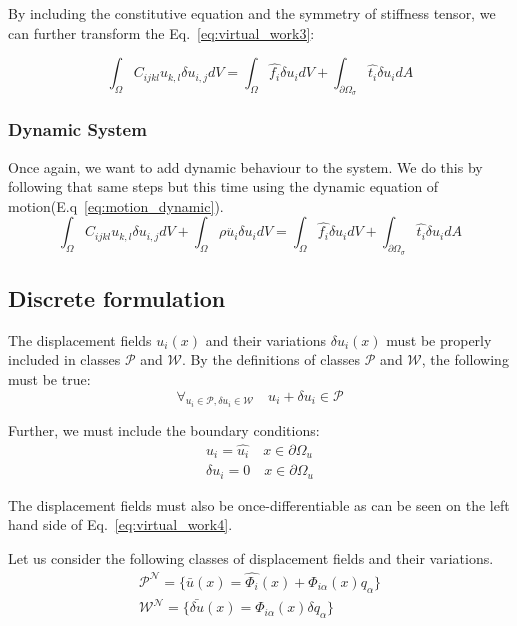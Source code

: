 \documentclass[en]{minipw} %
\begin{document}
By including the constitutive equation and the symmetry of stiffness tensor, we can further transform the Eq.~\ref{eq:virtual_work3}:

\begin{equation}
\label{eq:virtual_work4}
\int_{\Omega}C_{ijkl} u_{k,l} \delta u_{i,j} dV = \int_{\Omega} \hat{f_i} \delta u_{i} dV + \int_{\partial \Omega_{\sigma}} \hat{t_i} \delta u_{i} dA
\end{equation}

\subsubsection{Dynamic System}
Once again, we want to add dynamic behaviour to the system. We do this by following that same steps but this time using the dynamic equation of motion(E.q~\ref{eq:motion_dynamic}).
\begin{equation}
\label{eq:virtual_work_dynamic4}
\int_{\Omega}C_{ijkl} u_{k,l} \delta u_{i,j} dV + \int_{\Omega}\rho \ddot{u_i} \delta u_i dV = \int_{\Omega} \hat{f_i} \delta u_{i} dV + \int_{\partial \Omega_{\sigma}} \hat{t_i} \delta u_{i} dA
\end{equation}

\subsection{Discrete formulation}

The displacement fields $u_{i}(x)$ and their variations $\delta u_{i}(x)$ must be properly included in classes $\mathcal{P}$ and $\mathcal{W}$. By the definitions of classes $\mathcal{P}$ and $\mathcal{W}$, the following must be true:
\begin{equation}
\forall_{u_{i} \in \mathcal{P}, \delta u_{i} \in \mathcal{W}} \quad u_i + \delta u_i \in \mathcal{P}
\end{equation}

Further, we must include the boundary conditions:
\begin{equation}
\begin{aligned}
u_i = \hat{u_i} \quad x \in \partial  \Omega_{u}
\\
\delta u_i = 0 \quad x \in \partial  \Omega_{u}
\end{aligned}
\end{equation}

The displacement fields must also be once-differentiable as can be seen on the left hand side of Eq.~\ref{eq:virtual_work4}.

Let us consider the following classes of displacement fields and their variations.
\begin{equation}
\begin{aligned}
\mathcal{P^{N}} = \{\bar{u}(x) = \hat{\Phi_i}(x) + \Phi_{i \alpha}(x)q_{\alpha} \}
\\
\mathcal{W^{N}} = \{\bar{\delta u}(x) = \Phi_{i \alpha}(x) \delta q_{\alpha} \}
\end{aligned}
\end{equation}
\end{document}
